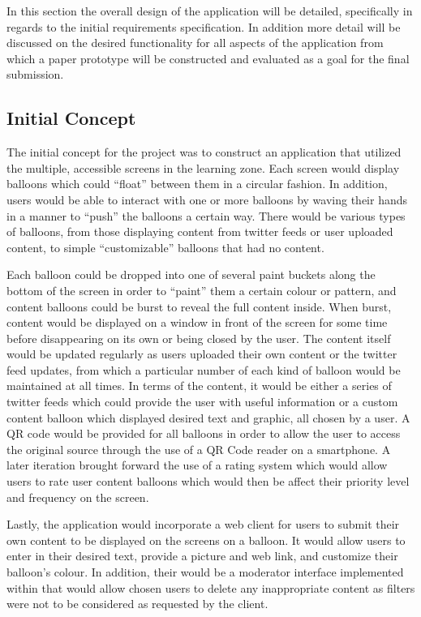 In this section the overall design of the application will be detailed, specifically in regards to the initial requirements specification. In addition more detail will be discussed on the desired functionality for all aspects of the application from which a paper prototype will be constructed and evaluated as a goal for the final submission.

\subsection{Initial Concept}
The initial concept for the project was to construct an application that utilized the multiple, accessible screens in the learning zone. Each screen would display balloons which could ``float'' between them in a circular fashion. In addition, users would be able to interact with one or more balloons by waving their hands in a manner to ``push'' the balloons a certain way. There would be various types of balloons, from those displaying content from twitter feeds or user uploaded content, to simple ``customizable'' balloons that had no content.

Each balloon could be dropped into one of several paint buckets along the bottom of the screen in order to ``paint'' them a certain colour or pattern, and content balloons could be burst to reveal the full content inside. When burst, content would be displayed on a window in front of the screen for some time before disappearing on its own or being closed by the user. The content itself would be updated regularly as users uploaded their own content or the twitter feed updates, from which a particular number of each kind of balloon would be maintained at all times. In terms of the content, it would be either a series of twitter feeds which could provide the user with useful information or a custom content balloon which displayed desired text and graphic, all chosen by a user. A QR code would be provided for all balloons in order to allow the user to access the original source through the use of a QR Code reader on a smartphone. A later iteration brought forward the use of a rating system which would allow users to rate user content balloons which would then be affect their priority level and frequency on the screen.

Lastly, the application would incorporate a web client for users to submit their own content to be displayed on the screens on a balloon. It would allow users to enter in their desired text, provide a picture and web link, and customize their balloon's colour. In addition, their would be a moderator interface implemented within that would allow chosen users to delete any inappropriate content as filters were not to be considered as requested by the client.

